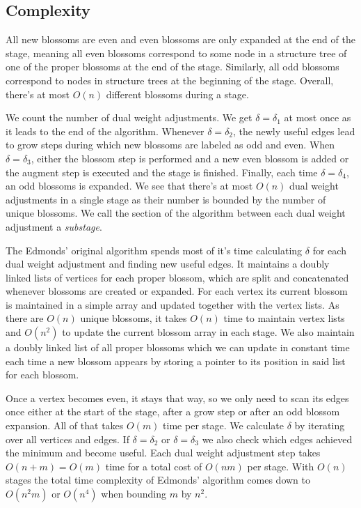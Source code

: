 \subsection{Complexity}

All new blossoms are even and even blossoms are only expanded at the end of the stage, meaning all even blossoms correspond to some node in a structure tree of one of the proper blossoms at the end of the stage. Similarly, all odd blossoms correspond to nodes in structure trees at the beginning of the stage. Overall, there's at most $O(n)$ different blossoms during a stage. 

We count the number of dual weight adjustments. We get $\delta = \delta_1$ at most once as it leads to the end of the algorithm. Whenever $\delta = \delta_2$, the newly useful edges lead to grow steps during which new blossoms are labeled as odd and even. When $\delta = \delta_3$, either the blossom step is performed and a new even blossom is added or the augment step is executed and the stage is finished. Finally, each time $\delta = \delta_4$, an odd blossoms is expanded. We see that there's at most $O(n)$ dual weight adjustments in a single stage as their number is bounded by the number of unique blossoms. We call the section of the algorithm between each dual weight adjustment a \textit{substage}.

The Edmonds' original algorithm spends most of it's time calculating $\delta$ for each dual weight adjustment and finding new useful edges. It maintains a doubly linked lists of vertices for each proper blossom, which are split and concatenated whenever blossoms are created or expanded. For each vertex its current blossom is maintained in a simple array and updated together with the vertex lists. As there are $O(n)$ unique blossoms, it takes $O(n)$ time to maintain vertex lists and $O(n^2)$ to update the current blossom array in each stage. We also maintain a doubly linked list of all proper blossoms which we can update in constant time each time a new blossom appears by storing a pointer to its position in said list for each blossom.

Once a vertex becomes even, it stays that way, so we only need to scan its edges once either at the start of the stage, after a grow step or after an odd blossom expansion. All of that takes $O(m)$ time per stage. We calculate $\delta$ by iterating over all vertices and edges. If $\delta = \delta_2$ or $\delta = \delta_3$ we also check which edges achieved the minimum and become useful. Each dual weight adjustment step takes $O(n+m)=O(m)$ time for a total cost of $O(nm)$ per stage. With $O(n)$ stages the total time complexity of Edmonds' algorithm comes down to $O(n^2m)$ or $O(n^4)$ when bounding $m$ by $n^2$.


